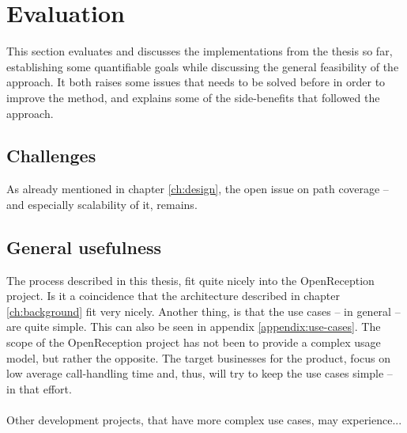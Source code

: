 \chapter{Evaluation}
This section evaluates and discusses the implementations from the thesis so far, establishing some quantifiable goals while discussing the general feasibility of the approach. It both raises some issues that needs to be solved before in order to improve the method, and explains some of the side-benefits that followed the approach.

\section{Challenges}
As already mentioned in chapter \ref{ch:design}, the open issue on path coverage -- and especially scalability of it, remains.

\section{General usefulness}
The process described in this thesis, fit quite nicely into the OpenReception project. Is it a coincidence that the architecture described in chapter \ref{ch:background} fit very nicely. Another thing, is that the use cases -- in general -- are quite simple. This can also be seen in appendix \ref{appendix:use-cases}. The scope of the OpenReception project has not been to provide a complex usage model, but rather the opposite. The target businesses for the product, focus on low average call-handling time and, thus, will try to keep the use cases simple -- in that effort.\\\\
Other development projects, that have more complex use cases, may experience...


